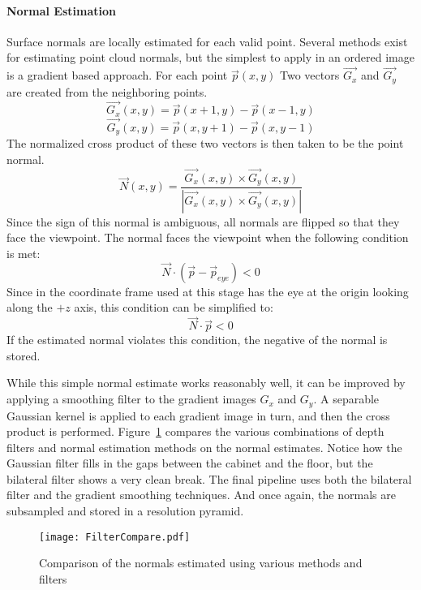 \paragraph{Normal Estimation}
Surface normals are locally estimated for each valid point. Several methods exist for estimating point cloud normals, but the simplest to apply in an ordered image is a gradient based approach. For each point $\vec{p}(x,y)$ Two vectors $\vec{G_x}$ and $\vec{G_y}$ are created from the neighboring points. $$\vec{G_x}(x,y)=\vec{p}(x+1,y)-\vec{p}(x-1,y)$$ $$\vec{G_y}(x,y)=\vec{p}(x,y+1)-\vec{p}(x,y-1)$$
The normalized cross product of these two vectors is then taken to be the point normal. $$\vec{N}(x,y)= \frac{\vec{G_x}(x,y) \times \vec{G_y}(x,y)}{|\vec{G_x}(x,y) \times \vec{G_y}(x,y)|}$$
Since the sign of this normal is ambiguous, all normals are flipped so that they face the viewpoint. The normal faces the viewpoint when the following condition is met: $$\vec{N} \cdot (\vec{p}-\vec{p}_{eye}) < 0$$
Since in the coordinate frame used at this stage has the eye at the origin looking along the $+z$ axis, this condition can be simplified to: $$\vec{N} \cdot \vec{p} < 0$$
If the estimated normal violates this condition, the negative of the normal is stored.\par
While this simple normal estimate works reasonably well, it can be improved by applying a smoothing filter to the gradient images $G_x$ and $G_y$. A separable Gaussian kernel is applied to each gradient image in turn, and then the cross product is performed. Figure~\ref{fig:filtercompare} compares the various combinations of depth filters and normal estimation methods on the normal estimates. Notice how the Gaussian filter fills in the gaps between the cabinet and the floor, but the bilateral filter shows a very clean break. The final pipeline uses both the bilateral filter and the gradient smoothing techniques. And once again, the normals are subsampled and stored in a resolution pyramid.

\begin{figure}[ht]
    \centering
    \texttt{[image: FilterCompare.pdf]}
    \caption{Comparison of the normals estimated using various methods and filters}
    \label{fig:filtercompare}
\end{figure}

